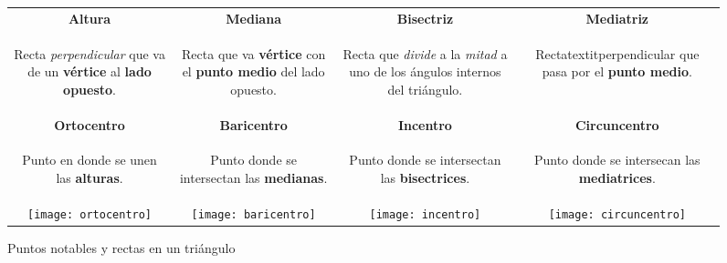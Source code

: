 \begin{figure*}[h!]
\def\arraystretch{1.5}%
\caption[Puntos notables]{Puntos notables y rectas en un triángulo}
\label{puntosnot}
\begin{tabular}{c  c  c  c }
	\textbf{Altura} & 
	\textbf{Mediana} & 
	\textbf{Bisectriz} &
	\textbf{Mediatriz}
	\\
	\parbox{4cm}{ \begin{flushleft}
		Recta \textit{perpendicular} que va de un \textbf{vértice}
		al \textbf{lado opuesto}.
	\end{flushleft}}  & 
	\parbox{4cm}{ \begin{flushleft}
		Recta que va \textbf{vértice} con el \textbf{punto medio} 
		del lado opuesto. 
	\end{flushleft}}  & 
	\parbox{4cm}{ \begin{flushleft}		
		Recta que \textit{divide} a la \textit{mitad} a uno de los 	ángulos internos
		del triángulo. 
	\end{flushleft}}  & 		
	\parbox{4cm}{ \begin{flushleft}		
		Rectatextit{perpendicular} que pasa por el \textbf{punto medio}.
	\end{flushleft}}  
	\\
	\textbf{Ortocentro} & 
	\textbf{Baricentro} & 
	\textbf{Incentro} &
	\textbf{Circuncentro}
	\\
	\parbox{4cm}{ \begin{flushleft}
		Punto en donde se unen las \textbf{alturas}.
	\end{flushleft}}  & 
	\parbox{4cm}{ \begin{flushleft}
		Punto donde se intersectan las \textbf{medianas}.
	\end{flushleft}}  & 
	\parbox{4cm}{ \begin{flushleft}		
		Punto donde se intersectan las \textbf{bisectrices}.
	\end{flushleft}}  & 		
	\parbox{4cm}{ \begin{flushleft}		
		Punto donde se intersecan las \textbf{mediatrices}.
	\end{flushleft}}  
	\\
	\texttt{[image: ortocentro]} & 
	\texttt{[image: baricentro]}  & 
	\texttt{[image: incentro]} &
	\texttt{[image: circuncentro]} 
                                
\end{tabular}
\end{figure*}

